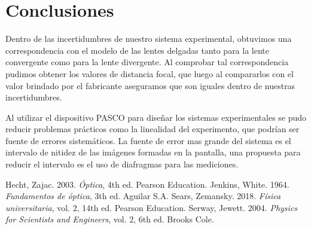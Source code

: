 \documentclass[a4paper,12pt]{article}
\newenvironment{Figure}
  {\par\medskip\noindent\minipage{\linewidth}}
  {\endminipage\par\medskip}
\begin{document}
\begin{multicols*}{2}
\begin{Figure}
            \label{tab:DistFocalAb}
        \end{Figure}

\section*{Conclusiones}
    
    Dentro de las incertidumbres de nuestro sistema experimental, obtuvimos una correspondencia con el modelo de las lentes delgadas tanto para la lente convergente como para la lente divergente. Al comprobar tal correspondencia pudimos obtener los valores de distancia focal, que luego al compararlos con el valor brindado por el fabricante aseguramos que son iguales dentro de nuestras incertidumbres.
  
    Al utilizar el dispositivo PASCO para diseñar los sistemas experimentales se pudo reducir problemas prácticos como la linealidad del experimento, que podrían ser fuente de errores sistemáticos. La fuente de error mas grande del sistema es el intervalo de nitidez de las imágenes formadas en la pantalla, una propuesta para reducir el intervalo es el uso de diafragmas para las mediciones.
    

\begin{thebibliography}{99}

     Hecht, Zajac. 2003. \emph{Óptica}, 4th ed. Pearson Education.
     Jenkins, White. 1964. \emph{Fundamentos de óptica}, 3th ed. Aguilar S.A.
     Sears, Zemansky. 2018. \emph{Física universitaria}, vol. 2, 14th ed. Pearson Education.
     Serway, Jewett. 2004. \emph{Physics for Scientists and Engineers}, vol. 2, 6th ed. Brooks Cole.

\end{thebibliography}
\end{multicols*}
\end{document}
